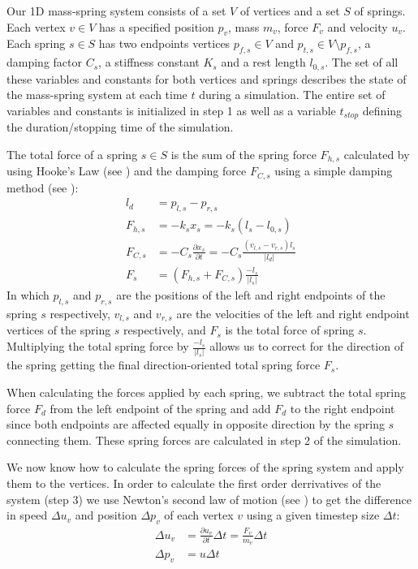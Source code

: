 \documentclass[11pt]{article}
\providecommand{\abs}[1]{\left \lvert #1 \right \rvert}
\begin{document}
Our 1D mass-spring system consists of a set $V$ of vertices and a set
$S$ of springs. Each vertex $v \in V$ has a specified position $p_v$,
mass $m_v$, force $F_v$ and velocity $u_v$. Each spring $s \in S$
has two endpoints vertices $p_{f,s} \in V$ and $p_{t,s} \in V \setminus
p_{f,s}$, a damping factor $C_s$, a stiffness constant $K_s$ and a rest length
$l_{0,s}$. The set of all these variables and constants for both vertices and
springs describes the state
of the mass-spring system at each time $t$ during a simulation. The entire set
of variables and constants is initialized in step 1 as well as a variable
$t_{stop}$ defining the duration/stopping time of the simulation.

The total force of a spring $s \in S$ is the sum of the spring force $F_{h,s}$
calculated by using Hooke's Law (see \cite[p.~439]{Young:2010})
and the damping force $F_{C,s}$ using a simple damping method (see
\cite[p.~457]{Young:2010}):
\begin{align}
    \nonumber l_d &= p_{l,s} - p_{r,s} \\
    \label{eq:hooke}
    F_{h,s} &= -k_s x_s = -k_s (l_s - l_{0,s}) \\
    \label{eq:damping}
    F_{C,s} &= -C_s \frac{\partial x_s}{ \partial t} = - C_s
        \frac{\left(v_{l,s} - v_{r,s}\right) l_s}{\abs{l_d}} \\
    F_s &= \left( F_{h,s} + F_{C,s} \right) \frac{-l_s}{\abs{l_s}}
\end{align}
In which $p_{l,s}$ and $p_{r,s}$ are the positions of the
left and right endpoints of the spring $s$ respectively, $v_{l,s}$ and
$v_{r,s}$ are the velocities of the left and right endpoint vertices of the
spring $s$ respectively, and $F_s$ is the total force of spring $s$. Multiplying
the total spring force by $\frac{-l_s}{\abs{l_s}}$ allows us to correct for the
direction of the spring getting the final direction-oriented total spring force
$F_s$.

When calculating the forces applied by each spring, we subtract the total spring
force $F_d$ from the left endpoint of the spring and add $F_d$ to the
right endpoint since both endpoints are affected equally in opposite direction
by the spring $s$ connecting them. These spring forces are calculated in step
2 of the simulation.

We now know how to calculate the spring forces of the spring system and apply them to
the vertices. In order to calculate the first order derrivatives of the system (step 3) we
use Newton's second law of motion (see \cite[p.~112-115]{Young:2010}) to get
the difference in speed $\Delta u_v$ and position $\Delta p_v$ of each vertex
$v$ using a given timestep size $\Delta t$:
\begin{align}
    \label{eq:delta_u}
    \Delta u_v &= \frac{\partial u_v}{\partial t} \Delta t = \frac{F_v}{m_v}
\Delta t \\
    \label{eq:delta_p} \Delta p_v &= u \Delta t
\end{align}
\end{document}
